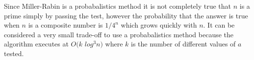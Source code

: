 Since Miller-Rabin is a probabalistics method it is not completely true that $n$ is a prime simply by passing the test, however the probability that the answer is true when $n$ is a composite number is $1 / 4^{n}$ which grows quickly with $n$. It can be considered a very small trade-off to use a probabalistics method because the algorithm executes at $O(k$ $log^3 n)$ where $k$ is the number of different values of $a$ tested. \cite{miller}
